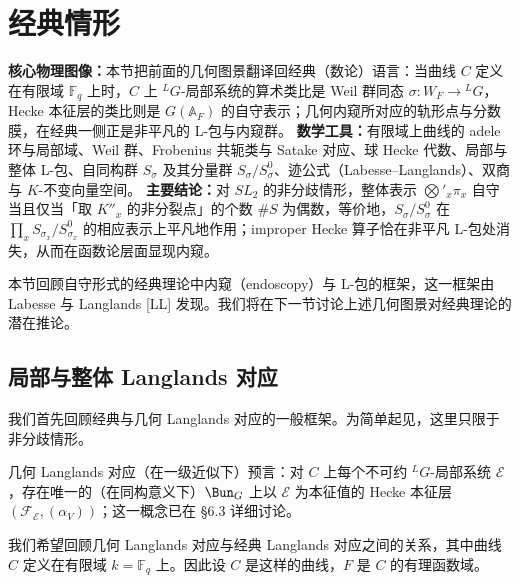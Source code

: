 

\section{经典情形}

\begin{keytakeaway}
\textbf{核心物理图像：}本节把前面的几何图景翻译回经典（数论）语言：当曲线 $C$ 定义在有限域 $\mathbb{F}_q$ 上时，$C$ 上 ${}^{L}G$-局部系统的算术类比是 Weil 群同态 $\sigma:W_F\to{}^{L}G$，Hecke 本征层的类比则是 $G(\mathbb{A}_F)$ 的自守表示；几何内窥所对应的轨形点与分数膜，在经典一侧正是非平凡的 L-包与内窥群。
\textbf{数学工具：}有限域上曲线的 adele 环与局部域、Weil 群、Frobenius 共轭类与 Satake 对应、球 Hecke 代数、局部与整体 L-包、自同构群 $S_\sigma$ 及其分量群 $S_\sigma/S_\sigma^0$、迹公式（Labesse--Langlands）、双商与 $K$-不变向量空间。
\textbf{主要结论：}对 $SL_2$ 的非分歧情形，整体表示 $\bigotimes'_{x}\pi_x$ 自守当且仅当「取 $K''_x$ 的非分裂点」的个数 $\#S$ 为偶数，等价地，$S_\sigma/S_\sigma^0$ 在 $\prod_x S_{\sigma_x}/S_{\sigma_x}^0$ 的相应表示上平凡地作用；improper Hecke 算子恰在非平凡 L-包处消失，从而在函数论层面显现内窥。
\end{keytakeaway}

本节回顾自守形式的经典理论中内窥（endoscopy）与 L-包的框架，这一框架由 Labesse 与 Langlands [LL] 发现。我们将在下一节讨论上述几何图景对经典理论的潜在推论。

\subsection{局部与整体 Langlands 对应}

我们首先回顾经典与几何 Langlands 对应的一般框架。为简单起见，这里只限于非分歧情形。

几何 Langlands 对应（在一级近似下）预言：对 $C$ 上每个不可约 ${}^{L}G$-局部系统 $\mathcal{E}$，存在唯一的（在同构意义下）$\Bun_G$ 上以 $\mathcal{E}$ 为本征值的 Hecke 本征层 $(\mathcal{F}_{\mathcal{E}},(\alpha_V))$；这一概念已在 §6.3 详细讨论。

我们希望回顾几何 Langlands 对应与经典 Langlands 对应之间的关系，其中曲线 $C$ 定义在有限域 $k=\mathbb{F}_q$ 上。因此设 $C$ 是这样的曲线，$F$ 是 $C$ 的有理函数域。

